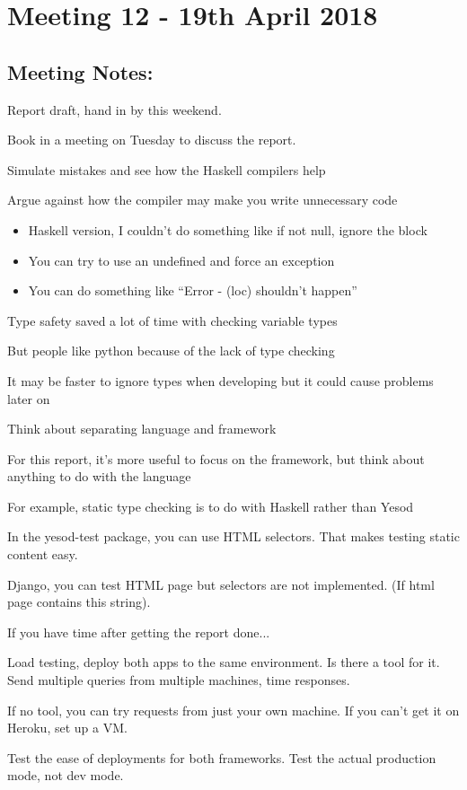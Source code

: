 \section{Meeting 12 - 19th April 2018}

\subsection{Meeting Notes:}
Report draft, hand in by this weekend.

Book in a meeting on Tuesday to discuss the report.

Simulate mistakes and see how the Haskell compilers help

Argue against how the compiler may make you write unnecessary code

\begin{itemize}
  \item{Haskell version, I couldn't do something like if not null, ignore the block}
  \item{You can try to use an undefined and force an exception}
  \item{You can do something like ``Error - (loc) shouldn't happen''}
\end{itemize}

Type safety saved a lot of time with checking variable types

But people like python because of the lack of type checking

It may be faster to ignore types when developing but it could cause problems later on

Think about separating language and framework

For this report, it's more useful to focus on the framework, but think about anything to do with the language

For example, static type checking is to do with Haskell rather than Yesod

In the yesod-test package, you can use HTML selectors. That makes testing static content easy.

Django, you can test HTML page but selectors are not implemented. (If html page contains this string).

If you have time after getting the report done...

Load testing, deploy both apps to the same environment. Is there a tool for it. Send 
multiple queries from multiple machines, time responses.

If no tool, you can try requests from just your own machine.
If you can't get it on Heroku, set up a VM.

Test the ease of deployments for both frameworks. Test the actual production mode, not dev mode.
